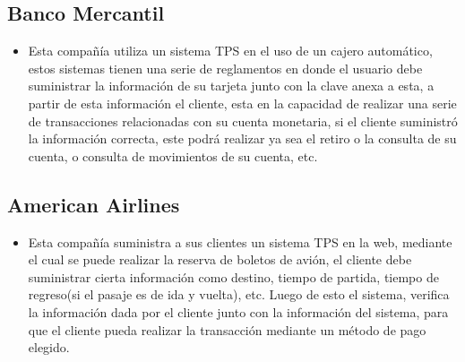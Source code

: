 \subsection{Banco Mercantil}
\begin{itemize}
\item Esta compañía utiliza un sistema TPS en el uso de un cajero automático, estos sistemas tienen una serie de reglamentos en donde el usuario debe suministrar la información de su tarjeta junto con la clave anexa a esta, a partir de esta información el cliente, esta en la capacidad de realizar una serie de transacciones relacionadas con su cuenta monetaria, si el cliente suministró la información correcta, este podrá realizar ya sea el retiro o la consulta de su cuenta, o consulta de movimientos de su cuenta, etc.
\end{itemize}
\subsection{American Airlines}
\begin{itemize}
\item Esta compañía suministra a sus clientes un sistema TPS en la web, mediante el cual se puede realizar la reserva de boletos de avión, el cliente debe suministrar cierta información como destino, tiempo de partida, tiempo de regreso(si el pasaje es de ida y vuelta), etc. Luego de esto el sistema, verifica la información dada por el cliente junto con la información del sistema, para que el cliente pueda realizar la transacción mediante un método de pago elegido.
\end{itemize}
